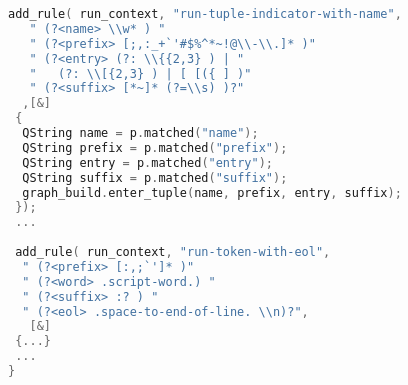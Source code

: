 \begin{lstlisting}[caption={Excerpt from a Hypergraph-Oriented Parser}, 
  language = C++, numbers = none,label={lst:rzsyn},
    basicstyle = \ttfamily\bfseries\footnotesize, linewidth = \linewidth]
 add_rule( run_context, "run-tuple-indicator-with-name",
   " (?<name> \\w* ) "
   " (?<prefix> [;,:_+`'#$%^*~!@\\-\\.]* )"
   " (?<entry> (?: \\{{2,3} ) | "
   "   (?: \\[{2,3} ) | [ [({ ] )"
   " (?<suffix> [*~]* (?=\\s) )?"
  ,[&]
 {
  QString name = p.matched("name");
  QString prefix = p.matched("prefix");
  QString entry = p.matched("entry");
  QString suffix = p.matched("suffix");
  graph_build.enter_tuple(name, prefix, entry, suffix);
 });
 ...
 
 add_rule( run_context, "run-token-with-eol",
  " (?<prefix> [:,;`']* )"
  " (?<word> .script-word.) "
  " (?<suffix> :? ) "
  " (?<eol> .space-to-end-of-line. \\n)?",
   [&]
 {...}
 ...
}
\end{lstlisting}

